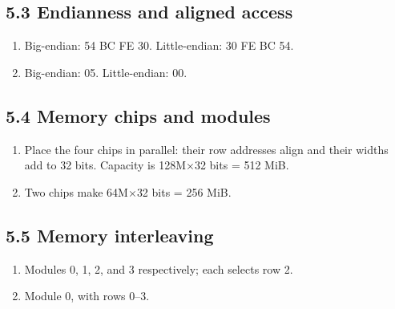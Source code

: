 \documentclass[11pt]{article}
\begin{document}
\begin{keepsection}\subsection{5.3 Endianness and aligned access}

\begin{enumerate}
\item Big-endian: 54 BC FE 30. Little-endian: 30 FE BC 54.
\item Big-endian: 05. Little-endian: 00.
\end{enumerate}

\end{keepsection}
\begin{keepsection}\subsection{5.4 Memory chips and modules}

\begin{enumerate}
\item Place the four chips in parallel: their row addresses align and their widths add to 32 bits. Capacity is 128M\ensuremath{\times}32 bits = 512 MiB.
\item Two chips make 64M\ensuremath{\times}32 bits = 256 MiB.
\end{enumerate}

\end{keepsection}
\begin{keepsection}\subsection{5.5 Memory interleaving}

\begin{enumerate}
\item Modules 0, 1, 2, and 3 respectively; each selects row 2.
\item Module 0, with rows 0–3.
\end{enumerate}

\end{keepsection}
\end{document}
